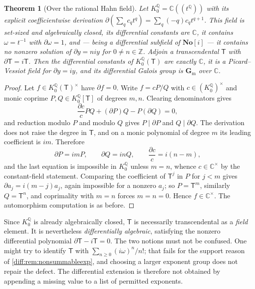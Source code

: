 \documentclass[11pt,letterpaper]{article}
\numberwithin{equation}{section}
\newtheorem{theorem}{Theorem}[section]
\theoremstyle{definition}
\theoremstyle{remark}
\newcommand{\SC}{\mathbf{No}[i]}
\newcommand{\C}{\mathbb C}
\newcommand{\Q}{\mathbb Q}
\newcommand{\Z}{\mathbb Z}
\newcommand{\der}{\partial}
\newcommand{\gm}{\mathbf G_{\mathrm m}}
\begin{document}
\begin{theorem}[Over the rational Hahn field]
\label{diff:thm:PVhahn}
Let $K_{0}^{\Q}=\C((t^{\Q}))$ with its explicit coefficientwise derivation
$\der(\sum_{q}c_{q}t^{q})=\sum_{q}(-q)c_{q}t^{q+1}$. This field is set-sized
and algebraically closed, its differential constants are $\C$, it contains
$\omega=t^{-1}$ with $\der\omega=1$, and --- being a differential subfield of
$\SC$ --- it contains no nonzero solution of $\der y=niy$ for
$0\neq n\in\Z$. Adjoin a transcendental $\mathsf T$ with $\der\mathsf T=i\mathsf T$. Then the
differential constants of $K_{0}^{\Q}(\mathsf T)$ are exactly $\C$, it is a
Picard--Vessiot field for $\der y=iy$, and its differential Galois group is
$\gm$ over $\C$.
\end{theorem}
\begin{proof}
Let $f\in K_{0}^{\Q}(\mathsf T)^{\times}$ have $\der f=0$. Write $f=cP/Q$ with
$c\in(K_{0}^{\Q})^{\times}$ and monic coprime $P,Q\in K_{0}^{\Q}[\mathsf T]$ of
degrees $m,n$. Clearing denominators gives
\[
 \frac{\der c}{c}PQ+(\der P)Q-P(\der Q)=0,
\]
and reduction modulo $P$ and modulo $Q$ gives $P\mid\der P$ and
$Q\mid\der Q$. The derivation does not raise the degree in $\mathsf T$, and on a monic
polynomial of degree $m$ its leading coefficient is $im$. Therefore
\[
 \der P=imP,\qquad \der Q=inQ,\qquad \frac{\der c}{c}=i(n-m),
\]
and the last equation is impossible in $K_{0}^{\Q}$ unless $m=n$, whence
$c\in\C^{\times}$ by the constant-field statement. Comparing the coefficient
of $\mathsf T^{j}$ in $P$ for $j<m$ gives $\der a_{j}=i(m-j)a_{j}$, again impossible
for a nonzero $a_{j}$; so $P=\mathsf T^{m}$, similarly $Q=\mathsf T^{n}$, and coprimality with
$m=n$ forces $m=n=0$. Hence $f\in\C^{\times}$. The automorphism computation is
as before.
\end{proof}

\begin{remark}
\label{diff:rem:transcendence}
Since $K_{0}^{\Q}$ is already algebraically closed, $\mathsf T$ is necessarily
transcendental as a \emph{field} element. It is nevertheless
\emph{differentially algebraic}, satisfying the nonzero differential
polynomial $\der\mathsf T-i\mathsf T=0$. The two notions must not be confused. One might try
to identify $\mathsf T$ with $\sum_{n\geq0}(i\omega)^{n}/n!$; that fails for the
support reason of \cref{diff:rem:nonsummableexp}, and choosing a larger
exponent group does not repair the defect. The differential extension is
therefore not obtained by appending a missing value to a list of permitted
exponents.
\end{remark}
\end{document}
